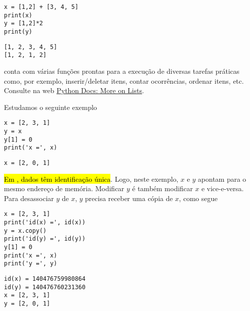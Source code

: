 \documentclass[a4paper,10pt,twoside]{article}
\begin{document}
\begin{lstlisting}
x = [1,2] + [3, 4, 5]
print(x)
y = [1,2]*2
print(y)
\end{lstlisting}

\begin{verbatim}
[1, 2, 3, 4, 5]
[1, 2, 1, 2]
\end{verbatim}

\begin{obs}
  {\PYTHONlist} conta com várias funções prontas para a execução de diversas tarefas práticas como, por exemplo, inserir/deletar itens, contar ocorrências, ordenar itens, etc. Consulte na web \href{https://docs.python.org/3/tutorial/datastructures.html#more-on-lists}{Python Docs: More on Lists}.
\end{obs}

\begin{obs}
  Estudamos o seguinte exemplo

\begin{lstlisting}
x = [2, 3, 1]
y = x
y[1] = 0
print('x =', x)
\end{lstlisting}

\begin{verbatim}
x = [2, 0, 1]
\end{verbatim}

  \hl{Em {\python}, dados têm identificação única}. Logo, neste exemplo, $x$ e $y$ apontam para o mesmo endereço de memória. Modificar $y$ é também modificar $x$ e vice-e-versa. Para desassociar $y$ de $x$, $y$ precisa receber uma cópia de $x$, como segue

\begin{lstlisting}
x = [2, 3, 1]
print('id(x) =', id(x))
y = x.copy()
print('id(y) =', id(y))
y[1] = 0
print('x =', x)
print('y =', y)
\end{lstlisting}

\begin{verbatim}
id(x) = 140476759980864
id(y) = 140476760231360
x = [2, 3, 1]
y = [2, 0, 1]
\end{verbatim}

\end{obs}
\end{document}
